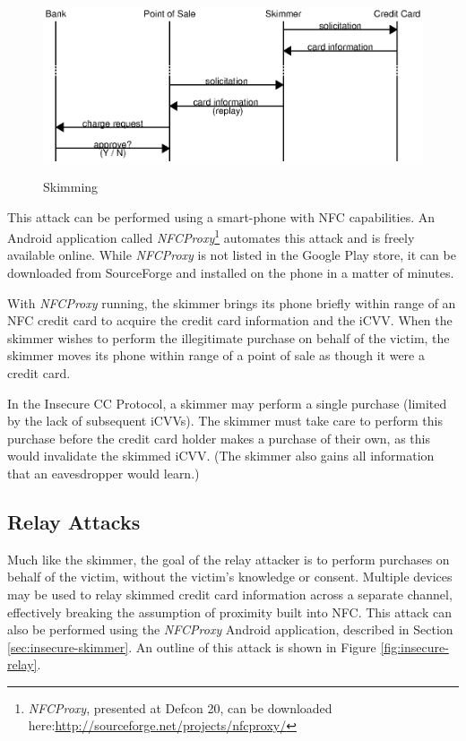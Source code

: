 \begin{figure}
  \caption{Skimming}
  \centering
    \includegraphics{img/attack-3-skim.eps}
  \label{fig:insecure-skimmer}
\end{figure}

This attack can be performed using a smart-phone with NFC capabilities.
An Android application called \emph{NFCProxy}\footnote{\emph{NFCProxy}\cite{NFCProxy}, presented at Defcon 20, can be downloaded here:\newline\url{http://sourceforge.net/projects/nfcproxy/}}
    automates this attack and is freely available online.
While \emph{NFCProxy} is not listed in the Google Play store, it can be downloaded from SourceForge and installed on the phone in a matter of minutes.

With \emph{NFCProxy} running, the skimmer brings its phone briefly within range of an NFC credit card to acquire the credit card information and  the iCVV.
When the skimmer wishes to perform the illegitimate purchase on behalf of the victim, the skimmer moves its phone within range of a point of sale as though it were a credit card.

In the Insecure CC Protocol, a skimmer may perform a single purchase (limited by the lack of subsequent iCVVs).
The skimmer must take care to perform this purchase before the credit card holder makes a purchase of their own, as this would invalidate the skimmed iCVV.
(The skimmer also gains all information that an eavesdropper would learn.)






\subsection{Relay Attacks}
\label{sec:insecure-relay}

Much like the skimmer, the goal of the relay attacker is to perform purchases on behalf of the victim, without the victim's knowledge or consent.
Multiple devices may be used to relay skimmed credit card information across a separate channel, effectively breaking the assumption of proximity built into NFC.
This attack can also be performed using the \emph{NFCProxy} Android application, described in Section \ref{sec:insecure-skimmer}.
An outline of this attack is shown in Figure \ref{fig:insecure-relay}.

